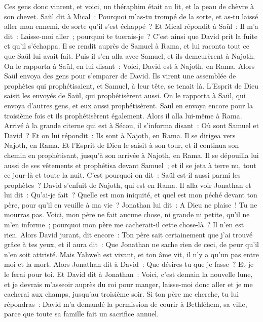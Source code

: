 \begin{multicols}{2}
Ces gens donc vinrent, et voici, un théraphim était au lit, et la peau de chèvre à son chevet.
Saül dit à Mical~: Pourquoi m'as-tu trompé de la sorte, et as-tu laissé aller mon ennemi, de sorte qu'il s'est échappé~? Et Mical répondit à Saül~: Il m'a dit~: Laisse-moi aller~; pourquoi te tuerais-je~?
C'est ainsi que David prit la fuite et qu'il s'échappa. Il se rendit auprès de Samuel à Rama, et lui raconta tout ce que Saül lui avait fait. Puis il s'en alla avec Samuel, et ils demeurèrent à Najoth.
On le rapporta à Saül, en lui disant~: Voici, David est à Najoth, en Rama.
Alors Saül envoya des gens pour s'emparer de David. Ils virent une assemblée de prophètes qui prophétisaient, et Samuel, à leur tête, se tenait là. L'Esprit de Dieu saisit les envoyés de Saül, qui prophétisèrent aussi.
On le rapporta à Saül, qui envoya d'autres gens, et eux aussi prophétisèrent. Saül en envoya encore pour la troisième fois et ils prophétisèrent également.
Alors il alla lui-même à Rama. Arrivé à la grande citerne qui est à Sécou, il s'informa disant~: Où sont Samuel et David~? Et on lui répondit~: Ils sont à Najoth, en Rama.
Il se dirigea vers Najoth, en Rama. Et l'Esprit de Dieu le saisit à son tour, et il continua son chemin en prophétisant, jusqu'à son arrivée à Najoth, en Rama.
Il se dépouilla lui aussi de ses vêtements et prophétisa devant Samuel~; et il se jeta à terre nu, tout ce jour-là et toute la nuit. C'est pourquoi on dit~: Saül est-il aussi parmi les prophètes~?
\VerseOne{}David s'enfuit de Najoth, qui est en Rama. Il alla voir Jonathan et lui dit~: Qu'ai-je fait~? Quelle est mon iniquité, et quel est mon péché devant ton père, pour qu'il en veuille à ma vie~?
Jonathan lui dit~: A Dieu ne plaise~! Tu ne mourras pas. Voici, mon père ne fait aucune chose, ni grande ni petite, qu'il ne m'en informe~; pourquoi mon père me cacherait-il cette chose-là~? Il n'en est rien.
Alors David jurant, dit encore~: Ton père sait certainement que j'ai trouvé grâce à tes yeux, et il aura dit~: Que Jonathan ne sache rien de ceci, de peur qu'il n'en soit attristé. Mais Yahweh est vivant, et ton âme vit, il n'y a qu'un pas entre moi et la mort.
Alors Jonathan dit à David~: Que désires-tu que je fasse~? Et je le ferai pour toi.
Et David dit à Jonathan~: Voici, c'est demain la nouvelle lune, et je devrais m'asseoir auprès du roi pour manger, laisse-moi donc aller et je me cacherai aux champs, jusqu'au troisième soir.
Si ton père me cherche, tu lui répondras~: David m'a demandé la permission de courir à Bethléhem, sa ville, parce que toute sa famille fait un sacrifice annuel.

\end{multicols}
